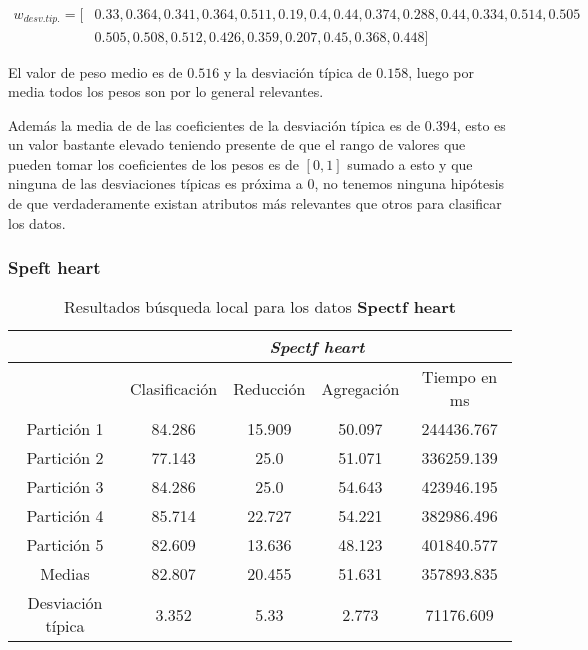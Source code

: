   \begin{align*}
    w_{desv. tip.} = [ 
      & 0.33, 0.364, 0.341, 0.364, 0.511, 0.19, 0.4, 0.44, 0.374, 0.288, 0.44, 0.334, 0.514, 0.505 \\
      & 0.505, 0.508, 0.512, 0.426, 0.359, 0.207, 0.45, 0.368, 0.448
     ]
\end{align*}

El valor de peso medio es de $0.516$ y la desviación típica de $0.158$, luego por media todos los pesos son por lo general relevantes. 

Además la media de de las coeficientes de la desviación típica es de $0.394$, esto es un valor bastante elevado teniendo presente de que el rango de valores 
que pueden tomar los coeficientes de los pesos es de $[0,1]$ 
sumado a esto y que ninguna de las desviaciones típicas es
próxima a $0$, no tenemos ninguna hipótesis de que verdaderamente 
existan atributos más relevantes que otros para clasificar los datos.


\subsubsection*{Speft heart} 

\begin{table}[H]
  \centering
  \begin{tabular}{|c|c|c|c|c|}
    \hline
    & \multicolumn{4}{|c|}{\textit{Spectf heart}}  \\
    \hline
    &	Clasificación &		Reducción	
    &	Agregación	&	Tiempo en ms \\
    \hline
  
    Partición 1 &    84.286   &  15.909   &  50.097   &  244436.767   \\
    Partición 2 &	      77.143   &  25.0   &  51.071   &  336259.139  \\
    Partición 3 &	     84.286   &  25.0   &  54.643   &  423946.195   \\
    Partición 4	&     85.714   &  22.727   &  54.221   &  382986.496   \\
    Partición 5	 &      82.609   &  13.636   &  48.123   &  401840.577   \\
    \hline
    Medias 	 &      82.807   &  20.455   &  51.631   &  357893.835   \\
    \hline
    Desviación típica &	    3.352   &  5.33   &  2.773   &  71176.609   \\ 
    \hline  
  \end{tabular}
  \caption{Resultados búsqueda local para los datos \textbf{Spectf heart}}
  \label{table:BL_Spectf-heart}
\end{table}



